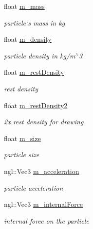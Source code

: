 \begin{DoxyCompactItemize}
float \hyperlink{classParticle_ab78b76aeb4d163132a0c27ea4c5beb75}{m\_\-mass}
\begin{DoxyCompactList}\small\item\em particle's mass in kg \item\end{DoxyCompactList}\item 
float \hyperlink{classParticle_a7ef5758b3dbc3ea263b670012f0c2fe5}{m\_\-density}
\begin{DoxyCompactList}\small\item\em particle density in kg/m$^\wedge$3 \item\end{DoxyCompactList}\item 
float \hyperlink{classParticle_a034612e9cd54961ae18980e9f36d2d93}{m\_\-restDensity}
\begin{DoxyCompactList}\small\item\em rest density \item\end{DoxyCompactList}\item 
float \hyperlink{classParticle_aa307c489c26622823817ce2083ac37a1}{m\_\-restDensity2}
\begin{DoxyCompactList}\small\item\em 2x rest density for drawing \item\end{DoxyCompactList}\item 
float \hyperlink{classParticle_acf841a001a93c2c613b13402e3947c16}{m\_\-size}
\begin{DoxyCompactList}\small\item\em particle size \item\end{DoxyCompactList}\item 
ngl::Vec3 \hyperlink{classParticle_ab98ecf309cee41177c34fbd64f3f33a9}{m\_\-acceleration}
\begin{DoxyCompactList}\small\item\em particle acceleration \item\end{DoxyCompactList}\item 
ngl::Vec3 \hyperlink{classParticle_ac4da3c37729ac9ed06664618d2a32f25}{m\_\-internalForce}
\begin{DoxyCompactList}\small\item\em internal force on the particle \item\end{DoxyCompactList}\item 

\end{DoxyCompactItemize}
